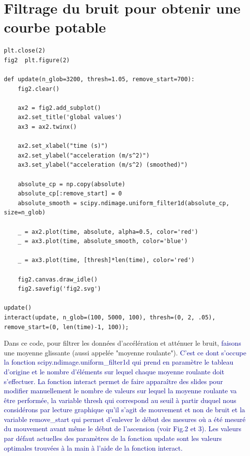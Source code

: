 \documentclass[11pt]{article}
\begin{document}
\begin{center}

\end{center}
\section{Filtrage du bruit pour obtenir une courbe potable}
\label{sec:org149ea3b}

\begin{verbatim}
plt.close(2)
fig2  plt.figure(2)

def update(n_glob=3200, thresh=1.05, remove_start=700):
    fig2.clear()

    ax2 = fig2.add_subplot()
    ax2.set_title('global values')
    ax3 = ax2.twinx()

    ax2.set_xlabel("time (s)")
    ax2.set_ylabel("acceleration (m/s^2)")
    ax3.set_ylabel("acceleration (m/s^2) (smoothed)")

    absolute_cp = np.copy(absolute)
    absolute_cp[:remove_start] = 0
    absolute_smooth = scipy.ndimage.uniform_filter1d(absolute_cp, size=n_glob)

    _ = ax2.plot(time, absolute, alpha=0.5, color='red')
    _ = ax3.plot(time, absolute_smooth, color='blue')

    _ = ax3.plot(time, [thresh]*len(time), color='red')

    fig2.canvas.draw_idle()
    fig2.savefig('fig2.svg')

update()
interact(update, n_glob=(100, 5000, 100), thresh=(0, 2, .05), remove_start=(0, len(time)-1, 100));
\end{verbatim}

Dans ce code, pour filtrer les données d'accélération et atténuer le bruit, \textcolor{darkblue}{faisons} une moyenne glissante (aussi appelée "moyenne
roulante"). \textcolor{darkblue}{C'est ce dont s'occupe la fonction scipy.ndimage.uniform\_filter1d qui prend en paramètre le tableau d'origine et le nombre d'éléments sur lequel chaque moyenne roulante doit s'effectuer. La fonction interact permet de faire apparaître des slides pour modifier manuellement le nombre de valeurs sur lequel la moyenne roulante va être performée, la variable thresh qui correspond au seuil à partir duquel nous considérons par lecture graphique qu'il s'agit de mouvement et non de bruit et la variable remove\_start qui permet d'enlever le début des mesures où a été mesuré du mouvement avant même le début de l'ascension (voir Fig.2 et 3). Les valeurs par défaut actuelles des paramètres de la fonction update sont les valeurs optimales trouvées à la main à l'aide de la fonction interact.}
\end{document}
